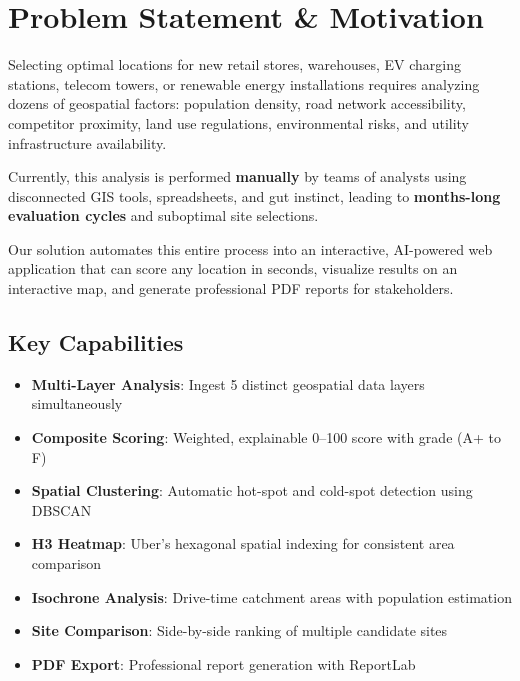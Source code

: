\documentclass[12pt, a4paper]{article}
\begin{document}
\tableofcontents
\newpage

\section{Problem Statement \& Motivation}

Selecting optimal locations for new retail stores, warehouses, EV charging stations,
telecom towers, or renewable energy installations requires analyzing dozens of
geospatial factors: population density, road network accessibility, competitor proximity,
land use regulations, environmental risks, and utility infrastructure availability.

Currently, this analysis is performed \textbf{manually} by teams of analysts using
disconnected GIS tools, spreadsheets, and gut instinct, leading to \textbf{months-long
evaluation cycles} and suboptimal site selections.

Our solution automates this entire process into an interactive, AI-powered web
application that can score any location in seconds, visualize results on an
interactive map, and generate professional PDF reports for stakeholders.

\subsection{Key Capabilities}

\begin{itemize}[leftmargin=2em]
    \item \textbf{Multi-Layer Analysis}: Ingest 5 distinct geospatial data layers simultaneously
    \item \textbf{Composite Scoring}: Weighted, explainable 0--100 score with grade (A+ to F)
    \item \textbf{Spatial Clustering}: Automatic hot-spot and cold-spot detection using DBSCAN
    \item \textbf{H3 Heatmap}: Uber's hexagonal spatial indexing for consistent area comparison
    \item \textbf{Isochrone Analysis}: Drive-time catchment areas with population estimation
    \item \textbf{Site Comparison}: Side-by-side ranking of multiple candidate sites
    \item \textbf{PDF Export}: Professional report generation with ReportLab
\end{itemize}
\end{document}
